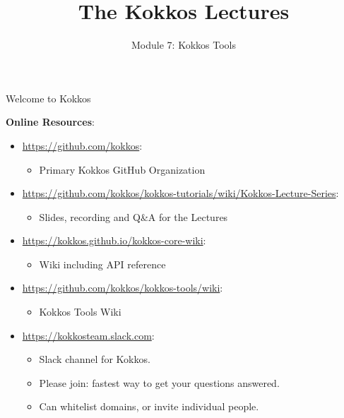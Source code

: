 
\def\sandid{SAND2020-9031 PE}

\title{The Kokkos Lectures}

\author{Module 7: Kokkos Tools}




\shortfalse
\mediumtrue
\fulltrue
\notoverviewtrue



\begin{frame}
	\titlepage
\end{frame}

\begin{frame}[fragile]{Welcome to Kokkos}

\textbf{Online Resources}:

\begin{itemize}
        \item \url{https://github.com/kokkos}:
                \begin{itemize}
                        \item Primary Kokkos GitHub Organization
                \end{itemize}
        \item \url{https://github.com/kokkos/kokkos-tutorials/wiki/Kokkos-Lecture-Series}:
                \begin{itemize}
			\item{Slides, recording and Q\&A for the Lectures}
                \end{itemize}
        \item \url{https://kokkos.github.io/kokkos-core-wiki}:
                \begin{itemize}
                        \item Wiki including API reference
                \end{itemize}
        \item \url{https://github.com/kokkos/kokkos-tools/wiki}:
                \begin{itemize}
                        \item Kokkos Tools Wiki
                \end{itemize}
        \item \url{https://kokkosteam.slack.com}:
                \begin{itemize}
                        \item Slack channel for Kokkos.
                        \item Please join: fastest way to get your questions answered.
                        \item Can whitelist domains, or invite individual people.
                \end{itemize}
\end{itemize}

\end{frame}


